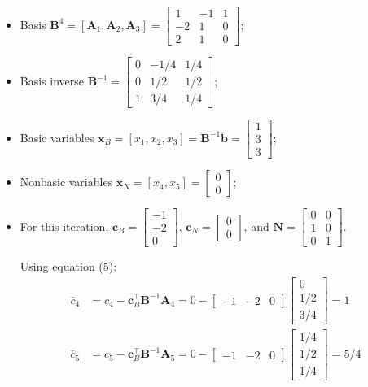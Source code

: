 \documentclass[11pt]{article}
\newcommand{\mb}[1]{\ensuremath{\boldsymbol{#1}}}
\begin{document}
\begin{enumerate}
\begin{itemize}
\item Basis $\mb{B}^4 = [\mb{A}_1,\mb{A}_2,\mb{A}_3] = \begin{bmatrix} 1 & -1 & 1 \\ -2 & 1 & 0 \\ 2 & 1 & 0 \end{bmatrix}$;

\item Basis inverse $\mb{B}^{-1} = \begin{bmatrix} 0 & -1/4 & 1/4 \\ 0 & 1/2 & 1/2 \\ 1 & 3/4 & 1/4 \end{bmatrix}$;

\item Basic variables $\mb{x}_B = [x_1, x_2, x_3] = \mb{B}^{-1}\mb{b} = \begin{bmatrix} 1 \\ 3 \\ 3 \end{bmatrix}$;

\item Nonbasic variables $\mb{x}_N = [x_4, x_5] = \begin{bmatrix} 0 \\ 0 \end{bmatrix}$;

\item For this iteration, $\mb{c}_B = \begin{bmatrix} -1 \\ -2 \\ 0 \end{bmatrix}$, $\mb{c}_N = \begin{bmatrix} 0 \\ 0 \end{bmatrix}$, and $\mb{N} = \begin{bmatrix} 0 & 0 \\ 1 & 0 \\ 0 & 1 \end{bmatrix}$.

Using equation (5):
\begin{align*}
\bar{c}_4 &= c_4 - \mb{c}_B^\top\mb{B}^{-1}\mb{A}_4 = 0 - \begin{bmatrix} -1 & -2 & 0 \end{bmatrix} \begin{bmatrix} 0 \\ 1/2 \\ 3/4 \end{bmatrix} = 1 \\
\bar{c}_5 &= c_5 - \mb{c}_B^\top\mb{B}^{-1}\mb{A}_5 = 0 - \begin{bmatrix} -1 & -2 & 0 \end{bmatrix} \begin{bmatrix} 1/4 \\ 1/2 \\ 1/4 \end{bmatrix} = 5/4
\end{align*}


\end{itemize}
\end{enumerate}
\end{document}

